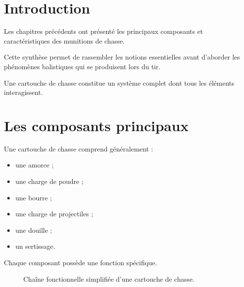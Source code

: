 
\section{Introduction}

Les chapitres précédents ont présenté les principaux composants et
caractéristiques des munitions de chasse.

Cette synthèse permet de rassembler les notions essentielles avant
d'aborder les phénomènes balistiques qui se produisent lors du tir.

\begin{aretenir}

Une cartouche de chasse constitue un système complet dont tous les éléments
interagissent.

\end{aretenir}

\section{Les composants principaux}

Une cartouche de chasse comprend généralement :

\begin{itemize}
    \item une amorce ;
    \item une charge de poudre ;
    \item une bourre ;
    \item une charge de projectiles ;
    \item une douille ;
    \item un sertissage.
\end{itemize}

Chaque composant possède une fonction spécifique.

\begin{figure}[htbp]
\centering


\caption{Chaîne fonctionnelle simplifiée d'une cartouche de chasse.}
\label{fig:chaine_cartouche}

\end{figure}

